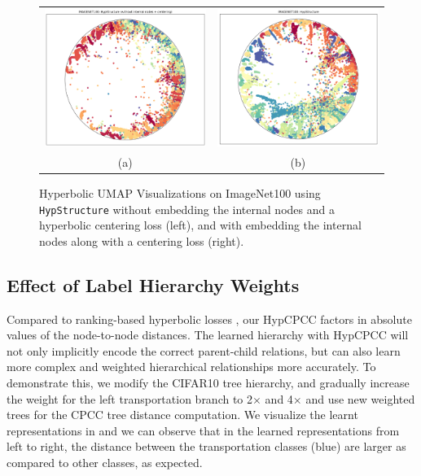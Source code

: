 \begin{figure}[ht]
\centering
\begin{tabular}{cc}
\includegraphics[width=.35\textwidth]{figures/hypstructure_poincare_disk_imagenet100_without_internal_centering.png}&
\includegraphics[width=.35\textwidth]{figures/hypstructure_poincare_disk_imagenet100.png}\\
{ (a)}&{ (b)} 
\end{tabular}
\caption{Hyperbolic UMAP Visualizations on ImageNet100 using \texttt{HypStructure} without embedding the internal nodes and a hyperbolic centering loss (left), and with embedding the internal nodes along with a centering loss (right).}
\label{fig:rebuttal_viz_2}
\end{figure}


\subsection{Effect of Label Hierarchy Weights}
Compared to ranking-based hyperbolic losses \citep{nickel2017poincare}, our HypCPCC factors in absolute values of the node-to-node distances. The learned hierarchy with HypCPCC will not only implicitly encode the correct parent-child relations, but can also learn more complex and weighted hierarchical relationships more accurately.
To demonstrate this, we modify the CIFAR10 tree hierarchy, and gradually increase the weight for the left transportation branch to 2$\times$ and 4$\times$ and use new weighted trees for the CPCC tree distance computation. We visualize the learnt representations in  and we can observe that in the learned representations from left to right, the distance between the transportation classes (blue) are larger as compared to other classes, as expected.

